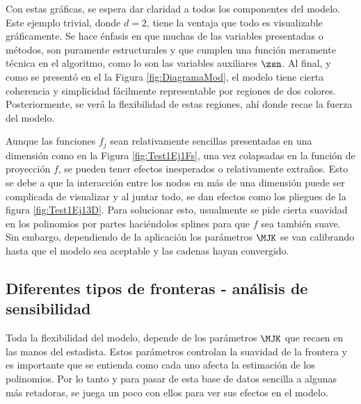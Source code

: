 Con estas gráficas, se espera dar claridad a todos los componentes del modelo. Este ejemplo trivial, donde $d = 2$, tiene la ventaja que todo es visualizable gráficamente. Se hace énfasis en que muchas de las variables presentadas o métodos, son puramente estructurales y que cumplen una función meramente técnica en el algoritmo, como lo son las variables auxiliares $\zsn$. Al final, y como se presentó en el la Figura \ref{fig:DiagramaMod}, el modelo tiene cierta coherencia y simplicidad fácilmente representable por regiones de dos colores. Posteriormente, se verá la flexibilidad de estas regiones, ahí donde recae la fuerza del modelo.

Aunque las funciones $f_j$ sean relativamente sencillas presentadas en una dimensión como en la Figura \ref{fig:Test1Ej1Fs}, una vez colapsadas en la función de proyección $f$, se pueden tener efectos inesperados o relativamente extraños. Esto se debe a que la interacción entre los nodos en más de una dimensión puede ser complicada de visualizar y al juntar todo, se dan efectos como los pliegues de la figura \ref{fig:Test1Ej13D}. Para solucionar esto, usualmente se pide cierta suavidad en los polinomios por partes haciéndolos splines para que $f$ sea también suave. Sin embargo, dependiendo de la aplicación los parámetros $\MJK$ se van calibrando hasta que el modelo sea aceptable y las cadenas hayan convergido. 

\subsection{Diferentes tipos de fronteras - análisis de sensibilidad } \label{sec:AnlisisSensibilidad}
Toda la flexibilidad del modelo, depende de los parámetros $\MJK$ que recaen en las manos del estadista. Estos parámetros controlan la suavidad de la frontera y es importante que se entienda como cada uno afecta la estimación de los polinomios. Por lo tanto y para pasar de esta base de datos sencilla a algunas más retadoras, se juega un poco con ellos para ver sus efectos en el modelo. 

